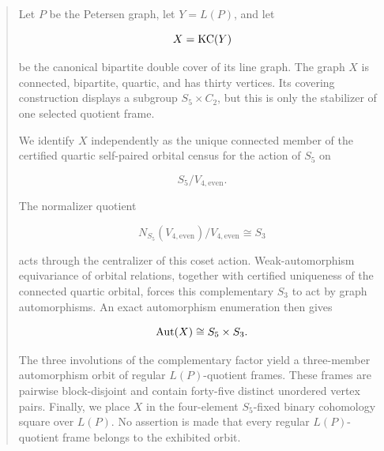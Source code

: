 \begin{abstract}

Let \(P\) be the Petersen graph, let \(Y=L(P)\), and let

\[
X=\KC(Y)
\]

be the canonical bipartite double cover of its line graph. The graph \(X\)
is connected, bipartite, quartic, and has thirty vertices. Its covering
construction displays a subgroup \(S_5\times C_2\), but this is only the
stabilizer of one selected quotient frame.

We identify \(X\) independently as the unique connected member of the
certified quartic self-paired orbital census for the action of \(S_5\) on

\[
S_5/V_{4,\mathrm{even}}.
\]

The normalizer quotient

\[
N_{S_5}(V_{4,\mathrm{even}})/V_{4,\mathrm{even}}
\cong S_3
\]

acts through the centralizer of this coset action. Weak-automorphism
equivariance of orbital relations, together with certified uniqueness of
the connected quartic orbital, forces this complementary \(S_3\) to act
by graph automorphisms. An exact automorphism enumeration then gives

\[
\Aut(X)\cong S_5\times S_3.
\]

The three involutions of the complementary factor yield a three-member
automorphism orbit of regular \(L(P)\)-quotient frames. These frames are
pairwise block-disjoint and contain forty-five distinct unordered vertex
pairs. Finally, we place \(X\) in the four-element \(S_5\)-fixed binary
cohomology square over \(L(P)\). No assertion is made that every regular
\(L(P)\)-quotient frame belongs to the exhibited orbit.

\end{abstract}

